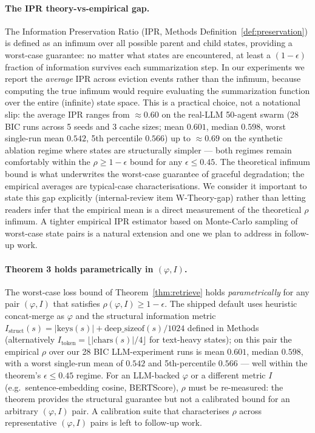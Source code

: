 \documentclass[fleqn,10pt]{article}
\theoremstyle{definition}
\newcommand{\info}{I}
\newcommand{\summarize}{\varphi}
\newcommand{\preserv}{\rho}
\begin{document}
\paragraph{The IPR theory-vs-empirical gap.}
The Information Preservation Ratio (IPR, Methods
Definition~\ref{def:preservation}) is defined as an infimum over all
possible parent and child states, providing a worst-case guarantee:
no matter what states are encountered, at least a $(1-\epsilon)$
fraction of information survives each summarization step. In our
experiments we report the \emph{average} IPR across eviction events
rather than the infimum, because computing the true infimum would
require evaluating the summarization function over the entire
(infinite) state space. This is a practical choice, not a notational
slip: the average IPR ranges from $\approx 0.60$ on the real-LLM
50-agent swarm (28 BIC runs across 5 seeds and 3 cache sizes; mean
$0.601$, median $0.598$, worst single-run mean $0.542$, 5th
percentile $0.566$) up to $\approx 0.69$ on the synthetic ablation
regime where states are structurally simpler --- both regimes
remain comfortably within the $\preserv \geq 1 - \epsilon$ bound for
any $\epsilon \leq 0.45$. The theoretical infimum bound is what
underwrites the worst-case guarantee of graceful degradation; the
empirical averages are typical-case characterisations. We consider
it important to state this gap explicitly (internal-review item
W-Theory-gap) rather than letting readers infer that the empirical
mean is a direct measurement of the theoretical $\preserv$
infimum. A tighter empirical IPR estimator based on Monte-Carlo
sampling of worst-case state pairs is a natural extension and one we
plan to address in follow-up work.

\paragraph{Theorem 3 holds parametrically in $(\summarize, I)$.}
The worst-case loss bound of Theorem~\ref{thm:retrieve} holds
\emph{parametrically} for any pair $(\summarize, \info)$ that satisfies
$\preserv(\summarize, \info) \geq 1 - \epsilon$. The shipped default
uses heuristic concat-merge as $\summarize$ and the structural
information metric $\info_{\text{struct}}(s) = |\text{keys}(s)| +
\mathrm{deep\_sizeof}(s)/1024$ defined in Methods (alternatively
$\info_{\text{token}} = \lfloor |\text{chars}(s)|/4 \rfloor$ for
text-heavy states); on this pair the empirical $\preserv$ over our
28 BIC LLM-experiment runs is mean $0.601$, median $0.598$, with a
worst single-run mean of $0.542$ and 5th-percentile $0.566$ ---
well within the theorem's $\epsilon \leq 0.45$ regime. For an
LLM-backed $\summarize$ or a different metric $\info$ (e.g.\
sentence-embedding cosine, BERTScore), $\preserv$ must be
re-measured: the theorem provides the structural guarantee but not
a calibrated bound for an arbitrary $(\summarize, \info)$ pair. A
calibration suite that
characterises $\preserv$ across representative
$(\summarize, \info)$ pairs is left to follow-up work.
\end{document}

